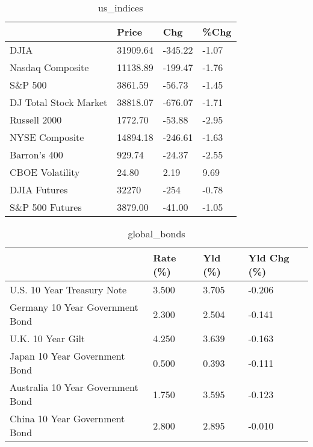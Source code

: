 \documentclass{article}%
\begin{document}
%


\begin{table}[htbp]%
\caption{us\_indices}%
\centering%
\begin{adjustbox}{width=1\textwidth}%
\begin{tabular}{llll}
\toprule
                      &    Price &     Chg &  \%Chg \\
\midrule
                 DJIA & 31909.64 & -345.22 & -1.07 \\
     Nasdaq Composite & 11138.89 & -199.47 & -1.76 \\
              S\&P 500 &  3861.59 &  -56.73 & -1.45 \\
DJ Total Stock Market & 38818.07 & -676.07 & -1.71 \\
         Russell 2000 &  1772.70 &  -53.88 & -2.95 \\
       NYSE Composite & 14894.18 & -246.61 & -1.63 \\
         Barron's 400 &   929.74 &  -24.37 & -2.55 \\
      CBOE Volatility &    24.80 &    2.19 &  9.69 \\
         DJIA Futures &    32270 &    -254 & -0.78 \\
      S\&P 500 Futures &  3879.00 &  -41.00 & -1.05 \\
\bottomrule
\end{tabular}
%
\end{adjustbox}%
\end{table}

%


\begin{table}[htbp]%
\caption{global\_bonds}%
\centering%
\begin{adjustbox}{width=1\textwidth}%
\begin{tabular}{llll}
\toprule
                                  & Rate (\%) & Yld (\%) & Yld Chg (\%) \\
\midrule
       U.S. 10 Year Treasury Note &    3.500 &   3.705 &      -0.206 \\
  Germany 10 Year Government Bond &    2.300 &   2.504 &      -0.141 \\
                U.K. 10 Year Gilt &    4.250 &   3.639 &      -0.163 \\
    Japan 10 Year Government Bond &    0.500 &   0.393 &      -0.111 \\
Australia 10 Year Government Bond &    1.750 &   3.595 &      -0.123 \\
    China 10 Year Government Bond &    2.800 &   2.895 &      -0.010 \\
\bottomrule
\end{tabular}
%
\end{adjustbox}%
\end{table}
\end{document}
